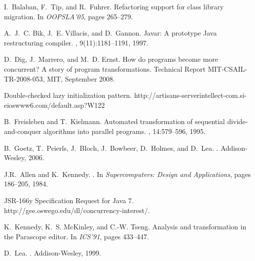 \documentclass[10pt,twocolumn]{article}
\begin{document}
% 
% 
\begin{thebibliography}{10}\setlength{\itemsep}{-1ex}\small

I.~Balaban, F.~Tip, and R.~Fuhrer.
\newblock Refactoring support for class library migration.
\newblock In {\em OOPSLA'05}, pages 265--279.

A.~J.~C. Bik, J.~E. Villacis, and D.~Gannon.
\newblock Javar: A prototype Java restructuring compiler.
, 9(11):1181--1191, 1997.

D.~Dig, J.~Marrero, and M.~D. Ernst.
\newblock How do programs become more concurrent? {A} story of program
  transformations.
\newblock Technical Report MIT-CSAIL-TR-2008-053, MIT, September 2008.

\newblock Double-checked lazy initialization pattern.
\newblock http://artisans-serverintellect-com.si-eioswww6.com/default.asp?W122

B.~Freisleben and T.~Kielmann.
\newblock Automated transformation of sequential divide-and-conquer
  algorithms into parallel programs.
, 14:579--596, 1995.

B.~Goetz, T.~Peierls, J.~Bloch, J.~Bowbeer, D.~Holmes, and D.~Lea.
.
\newblock Addison-Wesley, 2006.

J.R.~Allen and K.~Kennedy.
.
\newblock In {\em Supercomputers: Design and Applications}, pages 186--205,
  1984.

{JSR-166y Specification Request for Java 7}.
\newblock http://gee.oswego.edu/dl/concurrency-interest/.

K.~Kennedy, K.~S. McKinley, and C.-W. Tseng.
\newblock Analysis and transformation in the Parascope editor.
\newblock In {\em ICS'91}, pages 433--447.

D.~Lea.
.
\newblock Addison-Wesley, 1999.


\end{thebibliography}
\end{document}

